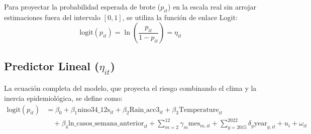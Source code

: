 \documentclass[11pt,a4paper]{article}
\begin{document}
Para proyectar la probabilidad esperada de brote ($p_{it}$) en la escala real sin arrojar estimaciones fuera del intervalo $[0, 1]$, se utiliza la función de enlace Logit:
\begin{equation}
	\text{logit}(p_{it}) = \ln\left(\frac{p_{it}}{1 - p_{it}}\right) = \eta_{it}
\end{equation}

\subsection{Predictor Lineal ($\eta_{it}$)}
La ecuación completa del modelo, que proyecta el riesgo combinando el clima y la inercia epidemiológica, se define como:
\begin{equation}
	\begin{aligned}
		\text{logit}(p_{it}) &= \beta_0 + \beta_1 \text{nino34\_12s}_{it} + \beta_2 \text{Rain\_acc3}_{it} + \beta_3 \text{Temperature}_{it} \\
		&\quad + \beta_4 \text{ln\_casos\_semana\_anterior}_{it}
		+ \sum_{m=2}^{12}\gamma_m \text{mes}_{m,it}
		+ \sum_{y=2015}^{2022}\delta_y \text{year}_{y,it} + u_i + \omega_{it}
	\end{aligned}
\end{equation}
\end{document}
